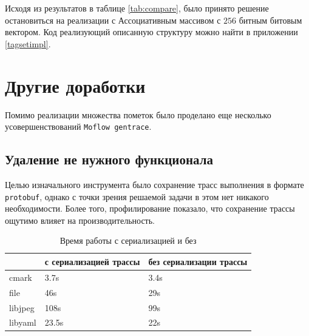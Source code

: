 \begin{table}[H]
    \caption{Время работы в секундах для различных реализаций} \label{tab:compare}
\end{table}

Исходя из результатов в таблице \ref{tab:compare}, было принято решение остановиться на реализации с Ассоциативным массивом с $256$ битным битовым вектором. Код реализующий описанную структуру можно найти в приложении \ref{tagsetimpl}.

\section{Другие доработки}

Помимо реализации множества пометок было проделано еще несколько усовершенствований \texttt{Moflow gentrace}.

\subsection{Удаление не нужного функционала}

Целью изначального инструмента было сохранение трасс выполнения в формате \texttt{protobuf}, однако с точки зрения решаемой задачи в этом нет никакого необходимости. Более того, профилирование показало, что сохранение трассы ощутимо влияет на производительность.


\begin{table}[H]
    \centering
    \caption{Время работы с сериализацией и без} \label{tab:compare2}
    \begin{tabular}[]{@{}lll@{}}
    \toprule
    & с сериализацией трассы & без сериализации трассы  \tabularnewline
    \midrule
    cmark & 3.7s & 3.4s \tabularnewline
    file & 46s & 29s \tabularnewline
    libjpeg & 108s & 99s \tabularnewline
    libyaml & 23.5s & 22s \tabularnewline
    \bottomrule
\end{tabular}
\end{table}

